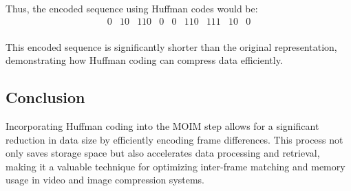 \documentclass[twocolumn]{article}
\begin{document}
Thus, the encoded sequence using Huffman codes would be:
\[
\begin{array}{ccccccccc}
0 & 10 & 110 & 0 & 0 & 110 & 111 & 10 & 0 \\
\end{array}
\]

This encoded sequence is significantly shorter than the original representation, demonstrating how Huffman coding can compress data efficiently.

\subsection{Conclusion}
Incorporating Huffman coding into the MOIM step allows for a significant reduction in data size by efficiently encoding frame differences. This process not only saves storage space but also accelerates data processing and retrieval, making it a valuable technique for optimizing inter-frame matching and memory usage in video and image compression systems.
\end{document}
